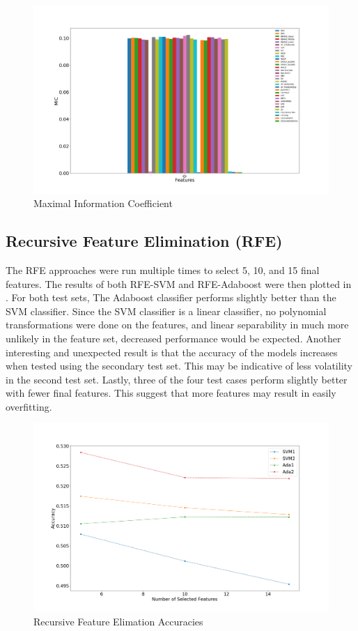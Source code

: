 \documentclass{article}\raggedbottom
\begin{document}
\begin{figure}[H]
	\centering
	\includegraphics[width=\linewidth]{data/MICT1.png}
	\caption{Maximal Information Coefficient}
	\label{fig:MIC}
\end{figure}

\subsection{Recursive Feature Elimination (RFE)}
The RFE approaches were run multiple times to select 5, 10, and 15 final features. The results of both RFE-SVM and RFE-Adaboost were then plotted in . For both test sets, The Adaboost classifier performs slightly better than the SVM classifier. Since the SVM classifier is a linear classifier, no polynomial transformations were done on the features, and linear separability in much more unlikely in the feature set, decreased performance would be expected. Another interesting and unexpected result is that the accuracy of the models increases when tested using the secondary test set. This may be indicative of less volatility in the second test set. Lastly, three of the four test cases perform slightly better with fewer final features. This suggest that more features may result in easily overfitting.

\begin{figure}[h!]
	\centering
	\includegraphics[width=\linewidth]{data/RFE_final.png}
	\caption{Recursive Feature Elimation Accuracies}
	\label{fig:RFE}
\end{figure}
\end{document}
